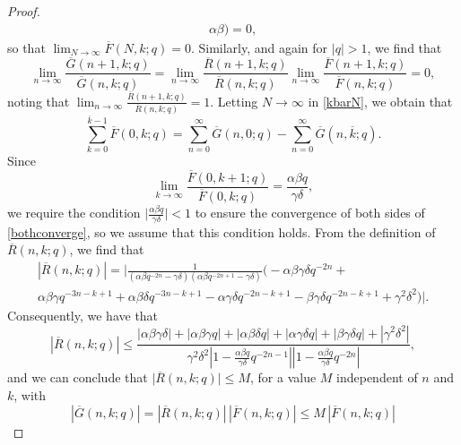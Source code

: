 \documentclass[10pt,a4paper]{amsart}
\begin{document}
\begin{proof}
\begin{multline*}
{ \alpha \beta) } = 0, 
\end{multline*} 
 so that $\lim_{N \to \infty} \overline{F}(N,k;q) = 0$. Similarly, and again for $|q| > 1$, we find that 
 $$ \lim_{n \to \infty} \frac{ \overline{G}(n+1,k;q) }{\overline{G}(n,k;q)} 
 = \lim_{n \to \infty} \frac{ \overline{R}(n+1,k;q) }{\overline{R}(n,k;q)} \lim_{n \to \infty} \frac{\overline{F}(n+1,k;q)}{\overline{F}(n,k;q)} = 0, $$
 noting that $ \lim_{n \to \infty} \frac{ \overline{R}(n+1,k;q) }{\overline{R}(n,k;q)} = 1$. 
 Letting $N \to \infty$ in \eqref{kbarN}, we obtain that 
\begin{equation}\label{bothconverge}
 \sum_{k=0}^{\overline{k} - 1} \overline{F}(0, k; q) = \sum_{n=0}^{\infty} \overline{G}(n, 0; q) - \sum_{n = 
  0}^{\infty} \overline{G}(n, \overline{k}; q). 
\end{equation}
 Since $$ \lim_{k \to \infty} \frac{ \overline{F}(0, k+1;q) }{\overline{F}(0, k;q)} = \frac{\alpha \beta q}{\gamma \delta}, $$
 we require the condition $\big| \frac{\alpha \beta q}{\gamma \delta} \big| < 1$
 to ensure the convergence of both sides of \eqref{bothconverge}, so we assume that this condition holds. 
 From the definition of $\overline{R}(n, k;q)$, we find that 
\begin{multline*}
 \left| \overline{R}(n, k; q) \right| = 
 \Bigg| \frac{1}{ \left( \alpha \beta q^{-2n} - \gamma \delta \right) 
 \left( \alpha \beta q^{-2n+1} - \gamma \delta \right)} 
 \big( -\alpha \beta \gamma \delta q^{-2n} + \\ \alpha \beta \gamma q^{-3n - k + 1} 
 + \alpha \beta \delta q^{-3n-k+1} - \alpha \gamma \delta q^{-2n - k + 1} - \beta \gamma \delta q^{-2n-k+1}
 + \gamma^{2} \delta^{2} \big) \Bigg|. 
\end{multline*}
 Consequently, we have that  $$ \left| \overline{R}(n, k; q) \right|   \leq \frac{ |\alpha \beta \gamma \delta| + |\alpha \beta \gamma q|      + 
  |\alpha \beta \delta q| + |\alpha \gamma \delta q| + |\beta \gamma \delta q|     + |\gamma^{2} \delta^{2}| }{ \gamma^{2} \delta^{2}  
  \left| 1 - \frac{\alpha \beta q}{\gamma \delta} q^{-2n-1} \right|    \left| 1 - \frac{\alpha \beta q}{\gamma \delta} q^{-2n} \right| }, $$   and  
    we can conclude that    $ \big| \overline{R}(n, k; q) \big| \leq M$,     for a value $M$ independent of $n$ and $k$,  with 
\begin{equation}\label{boundGwithF}
 \left| \overline{G}(n, k;q) \right| =    \left| \overline{R}(n, k;q) \right| \, \left| \overline{F}(n, k; q) \right|    \leq M \, \left| \overline{F}(n, k;  
  q) \right| 

\end{equation}
\end{proof}
\end{document}
